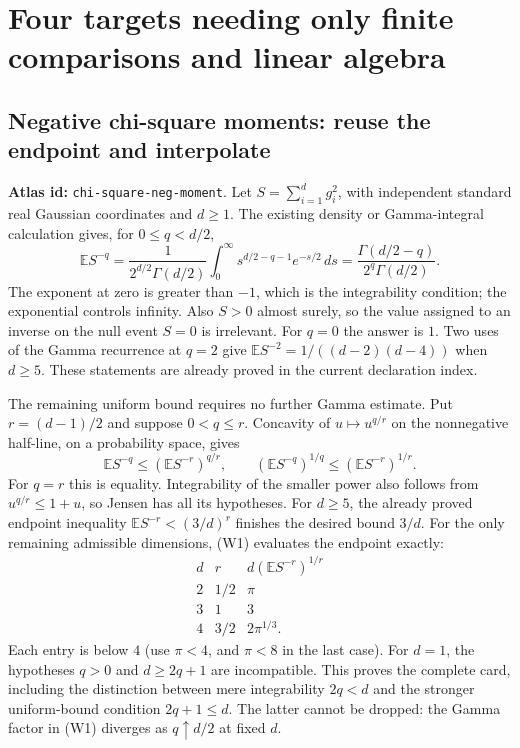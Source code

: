 \documentclass[11pt,a4paper]{article}
\DeclareRobustCommand{\code}[1]{{\footnotesize\urlstyle{tt}\nolinkurl{#1}}}
\begin{document}
\section{Four targets needing only finite comparisons and linear algebra}

\subsection{Negative chi-square moments: reuse the endpoint and interpolate}
\label{route:chi-square-neg-moment}
\textbf{Atlas id:} \code{chi-square-neg-moment}.
Let $S=\sum_{i=1}^d g_i^2$, with independent standard real Gaussian
coordinates and $d\ge1$. The existing density or Gamma-integral calculation
gives, for $0\le q<d/2$,
\[
 \mathbb E S^{-q}
 =\frac1{2^{d/2}\Gamma(d/2)}
      \int_0^\infty s^{d/2-q-1}e^{-s/2}\,ds
 =\frac{\Gamma(d/2-q)}{2^q\Gamma(d/2)}.                 \tag{W1}
\]
The exponent at zero is greater than $-1$, which is the integrability
condition; the exponential controls infinity. Also $S>0$ almost surely,
so the value assigned to an inverse on the null event $S=0$ is irrelevant.
For $q=0$ the answer is $1$. Two uses of the Gamma recurrence at $q=2$
give $\mathbb E S^{-2}=1/((d-2)(d-4))$ when $d\ge5$.
These statements are already proved in the current declaration index.

The remaining uniform bound requires no further Gamma estimate. Put
$r=(d-1)/2$ and suppose $0<q\le r$. Concavity of $u\mapsto u^{q/r}$ on
the nonnegative half-line, on a probability space, gives
\[
 \mathbb E S^{-q}\le(\mathbb E S^{-r})^{q/r},\qquad
 (\mathbb E S^{-q})^{1/q}\le(\mathbb E S^{-r})^{1/r}.    \tag{W2}
\]
For $q=r$ this is equality. Integrability of the smaller power also follows
from $u^{q/r}\le1+u$, so Jensen has all its hypotheses.
For $d\ge5$, the already proved endpoint inequality
$\mathbb E S^{-r}<(3/d)^r$ finishes the desired bound $3/d$.
For the only remaining admissible dimensions, (W1) evaluates the endpoint
exactly:
\[
\begin{array}{c|c|c}
 d&r& d(\mathbb ES^{-r})^{1/r}\\\hline
 2&1/2&\pi\\
 3&1&3\\
 4&3/2&2\pi^{1/3}.
\end{array}
\]
Each entry is below $4$ (use $\pi<4$, and $\pi<8$ in the last case).
For $d=1$, the hypotheses $q>0$ and $d\ge2q+1$ are incompatible.
This proves the complete card, including the distinction between mere
integrability $2q<d$ and the stronger uniform-bound condition $2q+1\le d$.
The latter cannot be dropped: the Gamma factor in (W1) diverges as
$q\uparrow d/2$ at fixed $d$.
\end{document}
